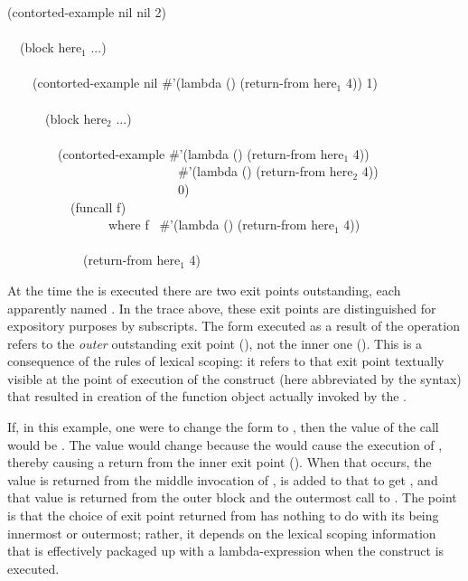 \begin{lisp}
(contorted-example nil nil 2) \\
 \\
~~(block here${}_1$ ...) \\
 \\
~~~~(contorted-example nil \#'(lambda () (return-from here${}_1$ 4)) 1) \\
 \\
~~~~~~(block here${}_2$ ...) \\
 \\
~~~~~~~~(contorted-example \#'(lambda () (return-from here${}_1$ 4)) \\
~~~~~~~~~~~~~~~~~~~~~~~~~~~\#'(lambda () (return-from here${}_2$ 4)) \\
~~~~~~~~~~~~~~~~~~~~~~~~~~~0) \\
~~~~~~~~~~(funcall f) \\
~~~~~~~~~~~~~~~~\textrm{where} f \EV\ \#'(lambda () (return-from here${}_1$ 4)) \\
 \\
~~~~~~~~~~~~(return-from here${}_1$ 4)
\end{lisp}

At the time the  is executed
there are two  exit points outstanding, each apparently
named .  In the trace above, these exit points are distinguished
for expository purposes by subscripts.
The  form executed as a result of the 
operation
refers to the \emph{outer} outstanding exit point
(), not the
inner one ().
This is a consequence of the rules of lexical scoping: it
refers to that exit point textually visible at the point of
execution of the 
construct (here abbreviated by the  syntax) that resulted
in creation of the function object actually invoked by the .

If, in this example, one were to change the form  to
, then the value of the call 
would be .  The value would change because the  would cause the
execution of , thereby causing
a return from the inner exit point ().
When that occurs, the value  is returned from the
middle invocation of ,  is added to that
to get , and that value is returned from the outer block
and the outermost call to .  The point
is that the choice of exit point returned from has nothing to do with its
being innermost or outermost; rather,
it depends on the lexical scoping information
that is effectively packaged up with a lambda-expression when the
 construct is executed.

